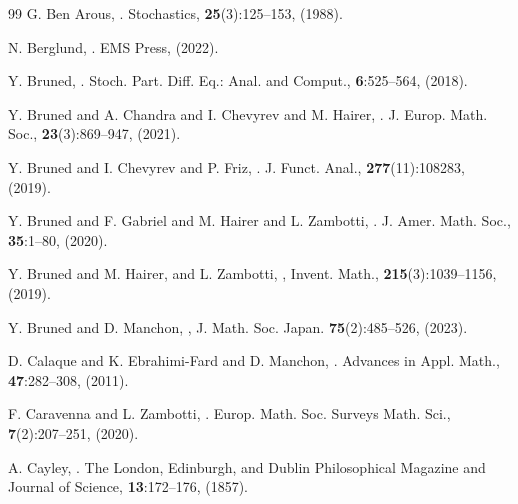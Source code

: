 \documentclass[10pt, reqno]{amsart}
\numberwithin{subsection}{section}
\numberwithin{subsubsection}{subsection}
\numberwithin{equation}{section} %
\theoremstyle{mystyle}
\theoremstyle{mystyle2}
\theoremstyle{mystyle3}
\begin{document}
\begin{thebibliography}{99}
G. Ben Arous,
.
\newblock Stochastics, {\bf 25}(3):125--153, (1988).

N. Berglund,
.
\newblock EMS Press, (2022).

Y. Bruned,
.
\newblock Stoch. Part. Diff. Eq.: Anal. and Comput., {\bf 6}:525--564, (2018).

Y. Bruned and A. Chandra and I. Chevyrev and M. Hairer,
.
\newblock J. Europ. Math. Soc., {\bf 23}(3):869--947, (2021).

Y. Bruned and I. Chevyrev and P. Friz,
.
\newblock J. Funct. Anal., {\bf 277}(11):108283, (2019).

Y. Bruned and F. Gabriel and M. Hairer and L. Zambotti,
.
\newblock J. Amer. Math. Soc., {\bf 35}:1--80, (2020).

Y. Bruned and M. Hairer, and L. Zambotti,
,
\newblock Invent. Math., {\bf 215}(3):1039--1156, (2019).

Y. Bruned and D. Manchon,
,
\newblock J. Math. Soc. Japan. {\bf 75}(2):485--526, (2023).

D. Calaque and K. Ebrahimi-Fard and D. Manchon,
.
\newblock Advances in Appl. Math., {\bf 47}:282--308, (2011).

F. Caravenna and L. Zambotti, 
.
\newblock Europ. Math. Soc. Surveys Math. Sci., {\bf 7}(2):207--251, (2020).

A. Cayley,
.
\newblock The London, Edinburgh, and Dublin Philosophical Magazine and Journal of Science, {\bf13}:172--176, (1857).


\end{thebibliography}
\end{document}
